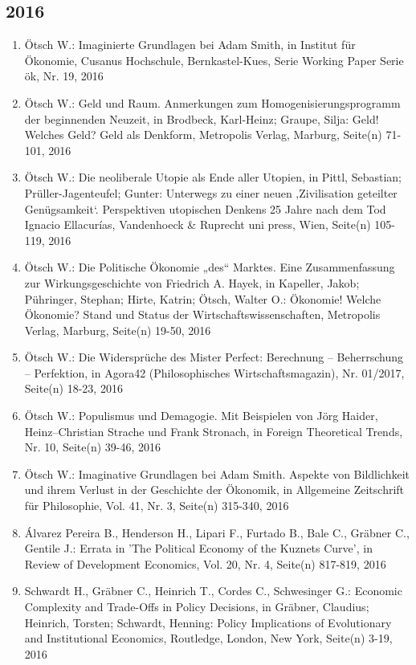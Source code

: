 \subsection*{2016}
\begin{enumerate}
    	 \item Ötsch W.: Imaginierte Grundlagen bei Adam Smith, in Institut für Ökonomie, Cusanus Hochschule, Bernkastel-Kues, Serie Working Paper Serie ök, Nr. 19, 2016
	 \item Ötsch W.: Geld und Raum. Anmerkungen zum Homogenisierungsprogramm der beginnenden Neuzeit, in Brodbeck, Karl-Heinz; Graupe, Silja: Geld! Welches Geld? Geld als Denkform, Metropolis Verlag, Marburg, Seite(n) 71-101, 2016
	 \item Ötsch W.: Die neoliberale Utopie als Ende aller Utopien, in Pittl, Sebastian; Prüller-Jagenteufel; Gunter: Unterwegs zu einer neuen ‚Zivilisation geteilter Genügsamkeit‘. Perspektiven utopischen Denkens 25 Jahre nach dem Tod Ignacio Ellacurías, Vandenhoeck \& Ruprecht uni press, Wien, Seite(n) 105-119, 2016
	 \item Ötsch W.: Die Politische Ökonomie „des“ Marktes. Eine Zusammenfassung zur Wirkungsgeschichte von Friedrich A. Hayek, in Kapeller, Jakob; Pühringer, Stephan; Hirte, Katrin; Ötsch, Walter O.: Ökonomie! Welche Ökonomie? Stand und Status der Wirtschaftswissenschaften, Metropolis Verlag, Marburg, Seite(n) 19-50, 2016
	 \item Ötsch W.: Die Widersprüche des Mister Perfect: Berechnung – Beherrschung – Perfektion, in Agora42 (Philosophisches Wirtschaftsmagazin), Nr. 01/2017, Seite(n) 18-23, 2016
	 \item Ötsch W.: Populismus und Demagogie. Mit Beispielen von Jörg Haider, Heinz–Christian Strache und Frank Stronach, in Foreign Theoretical Trends, Nr. 10, Seite(n) 39-46, 2016
	 \item Ötsch W.: Imaginative Grundlagen bei Adam Smith. Aspekte von Bildlichkeit und ihrem Verlust in der Geschichte der Ökonomik, in Allgemeine Zeitschrift für Philosophie, Vol. 41, Nr. 3, Seite(n) 315-340, 2016
	 \item Álvarez Pereira B., Henderson H., Lipari F., Furtado B., Bale C., Gräbner C., Gentile J.: Errata in 'The Political Economy of the Kuznets Curve', in Review of Development Economics, Vol. 20, Nr. 4, Seite(n) 817-819, 2016
	 \item Schwardt H., Gräbner C., Heinrich T., Cordes C., Schwesinger G.: Economic Complexity and Trade-Offs in Policy Decisions, in Gräbner, Claudius; Heinrich, Torsten; Schwardt, Henning: Policy Implications of Evolutionary and Institutional Economics, Routledge, London, New York, Seite(n) 3-19, 2016

\end{enumerate}
